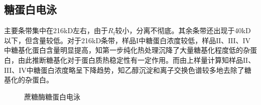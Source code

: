 \newpage
\subsection{糖蛋白电泳}
\par 主要条带集中在216kD左右，由于$R_\text{f}$较小，分离不彻底。其余条带还出现于40kD以下，但含量较低。对于216kD条带，样品$\mathrm{I}$中糖蛋白浓度较低，样品$\mathrm{II}$、$\mathrm{III}$、$\mathrm{IV}$中糖基化蛋白含量明显提高，知第一步纯化热处理沉降了大量糖基化程度低的杂蛋白，由此推断糖基化对于蛋白质热稳定性有一定作用。而由上样量计算知样品$\mathrm{II}$、$\mathrm{III}$、$\mathrm{IV}$中糖蛋白浓度略呈下降趋势，知乙醇沉淀和离子交换色谱较多地去除了糖基化的杂蛋白。

\begin{figure}[H]
    \caption{蔗糖酶糖蛋白电泳}
    \label{fig:EN}
\end{figure}



